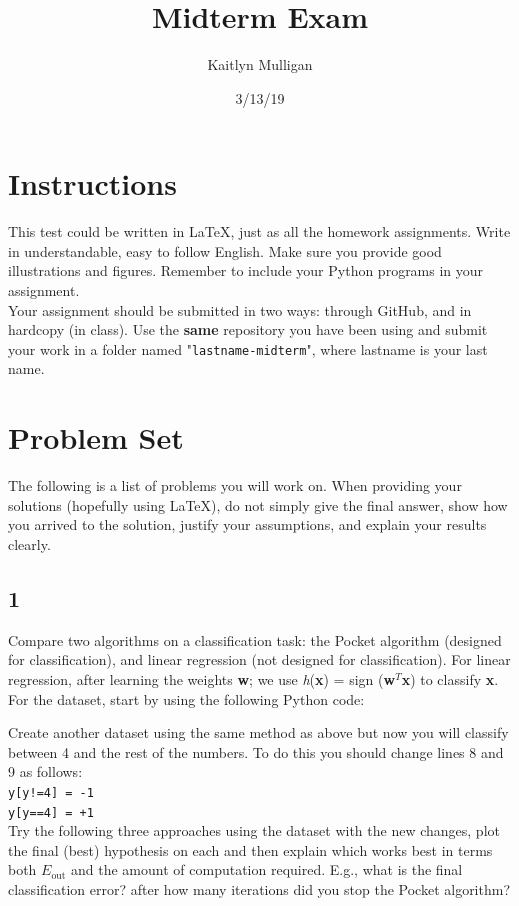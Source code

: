 \documentclass[a4paper]{article}
\title{Midterm Exam}
\author{Kaitlyn Mulligan}
\date{3/13/19}
\newcommand\tab[1][0.5cm]{\hspace*{#1}}
\begin{document}
\lstset{language=Python}

\maketitle

\section{Instructions}
This test could be written in \LaTeX, just as all the homework assignments.  Write in 
understandable, easy to follow English.  Make sure you provide good illustrations and 
figures.  Remember to include your Python programs in your assignment.\\
\tab Your assignment should be submitted in two ways: through GitHub, and in hardcopy (in 
class).  Use the \textbf{same} repository you have been using and submit your work in a 
folder named "\verb|lastname-midterm|", where lastname is your last name.


\section{Problem Set}
The following is a list of problems you will work on.  When providing your solutions (hopefully 
using \LaTeX), do not simply give the final answer, show how you arrived to the solution, justify 
your assumptions, and explain your results clearly.


\subsection{1} Compare two algorithms on a classification task: the Pocket algorithm (designed 
for classification), and linear regression (not designed for classification).  For linear 
regression, after learning the weights \textbf{w}; we use \textit{h}(\textbf{x}) = sign
(\textbf{w}$^T$\textbf{x}) to classify \textbf{x}.  For the dataset, start by using the following 
Python code:

Create another dataset using the same method as above but now you will classify between 4 and the 
rest of the numbers.  To do this you should change lines 8 and 9 as follows:\\
\verb|y[y!=4] = -1|\\
\verb|y[y==4] = +1|\\
Try the following three approaches using the dataset with the new changes, plot the final (best) 
hypothesis on each and then explain which works best in terms both $E_{\text{out}}$ and the 
amount of computation required.  E.g., what is the final classification error?  after how many 
iterations did you stop the Pocket algorithm?\\
\end{document}
